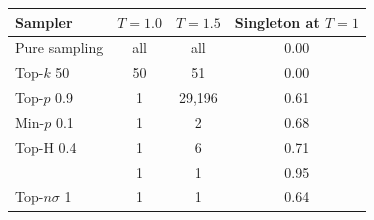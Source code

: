 \begin{tabular}{lccc}
\toprule
Sampler & $T{=}1.0$ & $T{=}1.5$ & Singleton at $T{=}1$ \\
\midrule
Pure sampling & all & all & 0.00 \\
Top-$k$ 50 & 50 & 51 & 0.00 \\
Top-$p$ 0.9 & 1 & 29,196 & 0.61 \\
Min-$p$ 0.1 & 1 & 2 & 0.68 \\
Top-H 0.4 & 1 & 6 & 0.71 \\
\pless{} & 1 & 1 & 0.95 \\
Top-$n\sigma$ 1 & 1 & 1 & 0.64 \\
\bottomrule
\end{tabular}
